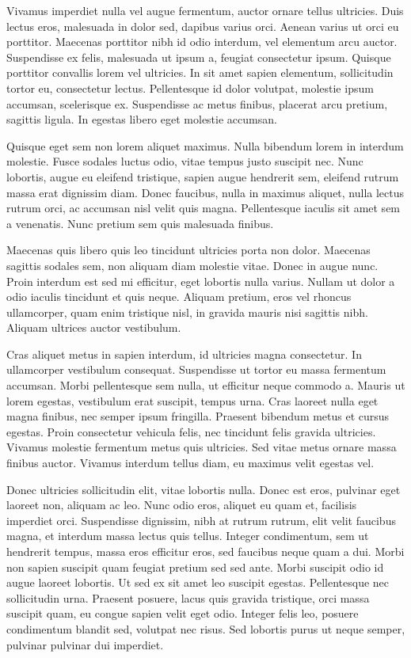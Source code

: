 \documentclass{homework}
\begin{document}
Vivamus imperdiet nulla vel augue fermentum, auctor ornare tellus ultricies. Duis lectus eros, malesuada in dolor sed, dapibus varius orci. Aenean varius ut orci eu porttitor. Maecenas porttitor nibh id odio interdum, vel elementum arcu auctor. Suspendisse ex felis, malesuada ut ipsum a, feugiat consectetur ipsum. Quisque porttitor convallis lorem vel ultricies. In sit amet sapien elementum, sollicitudin tortor eu, consectetur lectus. Pellentesque id dolor volutpat, molestie ipsum accumsan, scelerisque ex. Suspendisse ac metus finibus, placerat arcu pretium, sagittis ligula. In egestas libero eget molestie accumsan.

Quisque eget sem non lorem aliquet maximus. Nulla bibendum lorem in interdum molestie. Fusce sodales luctus odio, vitae tempus justo suscipit nec. Nunc lobortis, augue eu eleifend tristique, sapien augue hendrerit sem, eleifend rutrum massa erat dignissim diam. Donec faucibus, nulla in maximus aliquet, nulla lectus rutrum orci, ac accumsan nisl velit quis magna. Pellentesque iaculis sit amet sem a venenatis. Nunc pretium sem quis malesuada finibus.

Maecenas quis libero quis leo tincidunt ultricies porta non dolor. Maecenas sagittis sodales sem, non aliquam diam molestie vitae. Donec in augue nunc. Proin interdum est sed mi efficitur, eget lobortis nulla varius. Nullam ut dolor a odio iaculis tincidunt et quis neque. Aliquam pretium, eros vel rhoncus ullamcorper, quam enim tristique nisl, in gravida mauris nisi sagittis nibh. Aliquam ultrices auctor vestibulum.

Cras aliquet metus in sapien interdum, id ultricies magna consectetur. In ullamcorper vestibulum consequat. Suspendisse ut tortor eu massa fermentum accumsan. Morbi pellentesque sem nulla, ut efficitur neque commodo a. Mauris ut lorem egestas, vestibulum erat suscipit, tempus urna. Cras laoreet nulla eget magna finibus, nec semper ipsum fringilla. Praesent bibendum metus et cursus egestas. Proin consectetur vehicula felis, nec tincidunt felis gravida ultricies. Vivamus molestie fermentum metus quis ultricies. Sed vitae metus ornare massa finibus auctor. Vivamus interdum tellus diam, eu maximus velit egestas vel.

Donec ultricies sollicitudin elit, vitae lobortis nulla. Donec est eros, pulvinar eget laoreet non, aliquam ac leo. Nunc odio eros, aliquet eu quam et, facilisis imperdiet orci. Suspendisse dignissim, nibh at rutrum rutrum, elit velit faucibus magna, et interdum massa lectus quis tellus. Integer condimentum, sem ut hendrerit tempus, massa eros efficitur eros, sed faucibus neque quam a dui. Morbi non sapien suscipit quam feugiat pretium sed sed ante. Morbi suscipit odio id augue laoreet lobortis. Ut sed ex sit amet leo suscipit egestas. Pellentesque nec sollicitudin urna. Praesent posuere, lacus quis gravida tristique, orci massa suscipit quam, eu congue sapien velit eget odio. Integer felis leo, posuere condimentum blandit sed, volutpat nec risus. Sed lobortis purus ut neque semper, pulvinar pulvinar dui imperdiet.
\end{document}
